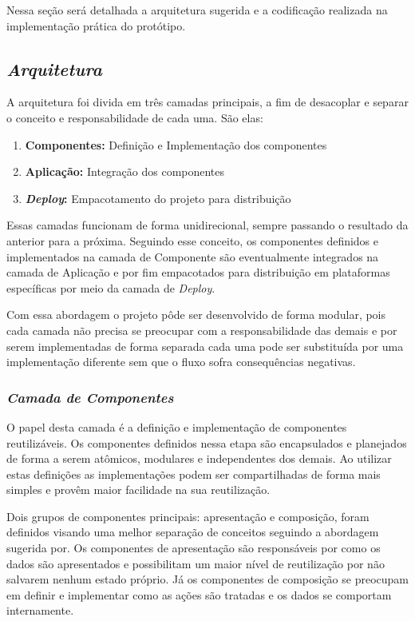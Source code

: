 Nessa seção será detalhada a arquitetura sugerida e a codificação realizada na implementação prática do protótipo.

\subsection{{\it Arquitetura}}

A arquitetura foi divida em três camadas principais, a fim de desacoplar e separar o conceito e responsabilidade de cada uma. São elas:

\begin{enumerate}
	\item \textbf{Componentes:} Definição e Implementação dos componentes
	\item \textbf{Aplicação:} Integração dos componentes 
	\item \textbf{\textit{Deploy}:} Empacotamento do projeto para distribuição
\end{enumerate}

Essas camadas funcionam de forma unidirecional, sempre passando o resultado da anterior para a próxima. Seguindo esse conceito, os componentes definidos e implementados na camada de Componente são eventualmente integrados na camada de Aplicação e por fim empacotados para distribuição em plataformas específicas por meio da camada de \textit{Deploy}. 

Com essa abordagem o projeto pôde ser desenvolvido de forma modular, pois cada camada não precisa se preocupar com a responsabilidade das demais e por serem implementadas de forma separada cada uma pode ser substituída por uma implementação diferente sem que o fluxo sofra consequências negativas.

\subsubsection{{\it Camada de Componentes}}

O papel desta camada é a definição e implementação de componentes reutilizáveis. Os componentes definidos nessa etapa são encapsulados e planejados de forma a serem atômicos, modulares e independentes dos demais. Ao utilizar estas definições as implementações podem ser compartilhadas de forma mais simples e provêm maior facilidade na sua reutilização.

Dois grupos de componentes principais: apresentação e composição, foram definidos visando uma melhor separação de conceitos seguindo a abordagem sugerida por\cite{presentContainerAbramov}. Os componentes de apresentação são responsáveis por como os dados são apresentados e possibilitam um maior nível de reutilização por não salvarem nenhum estado próprio. Já os componentes de composição se preocupam em definir e implementar como as ações são tratadas e os dados se comportam internamente.


